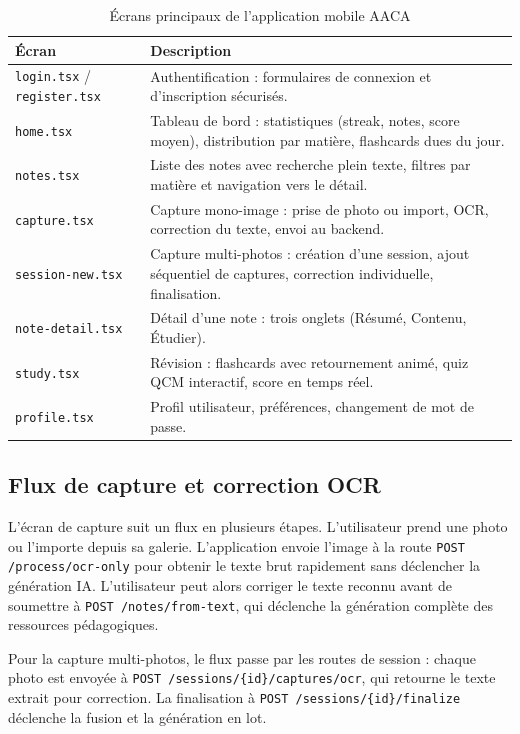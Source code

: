 \documentclass[12pt,a4paper]{report}
\begin{document}
\begin{table}[H]
\centering
\begin{tabularx}{\textwidth}{|p{3.5cm}|X|}
\hline
\textbf{Écran} & \textbf{Description}\\
\hline
\texttt{login.tsx} / \texttt{register.tsx} & Authentification : formulaires de connexion et d'inscription sécurisés.\\
\hline
\texttt{home.tsx} & Tableau de bord : statistiques (streak, notes, score moyen), distribution par matière, flashcards dues du jour.\\
\hline
\texttt{notes.tsx} & Liste des notes avec recherche plein texte, filtres par matière et navigation vers le détail.\\
\hline
\texttt{capture.tsx} & Capture mono-image : prise de photo ou import, OCR, correction du texte, envoi au backend.\\
\hline
\texttt{session-new.tsx} & Capture multi-photos : création d'une session, ajout séquentiel de captures, correction individuelle, finalisation.\\
\hline
\texttt{note-detail.tsx} & Détail d'une note : trois onglets (Résumé, Contenu, Étudier).\\
\hline
\texttt{study.tsx} & Révision : flashcards avec retournement animé, quiz QCM interactif, score en temps réel.\\
\hline
\texttt{profile.tsx} & Profil utilisateur, préférences, changement de mot de passe.\\
\hline
\end{tabularx}
\caption{Écrans principaux de l'application mobile AACA}
\label{tab:screens}
\end{table}

\subsection{Flux de capture et correction OCR}

L'écran de capture suit un flux en plusieurs étapes. L'utilisateur prend une photo ou l'importe depuis sa galerie. L'application envoie l'image à la route \texttt{POST /process/ocr-only} pour obtenir le texte brut rapidement sans déclencher la génération IA. L'utilisateur peut alors corriger le texte reconnu avant de soumettre à \texttt{POST /notes/from-text}, qui déclenche la génération complète des ressources pédagogiques.

Pour la capture multi-photos, le flux passe par les routes de session : chaque photo est envoyée à \texttt{POST /sessions/\{id\}/captures/ocr}, qui retourne le texte extrait pour correction. La finalisation à \texttt{POST /sessions/\{id\}/finalize} déclenche la fusion et la génération en lot.
\end{document}
